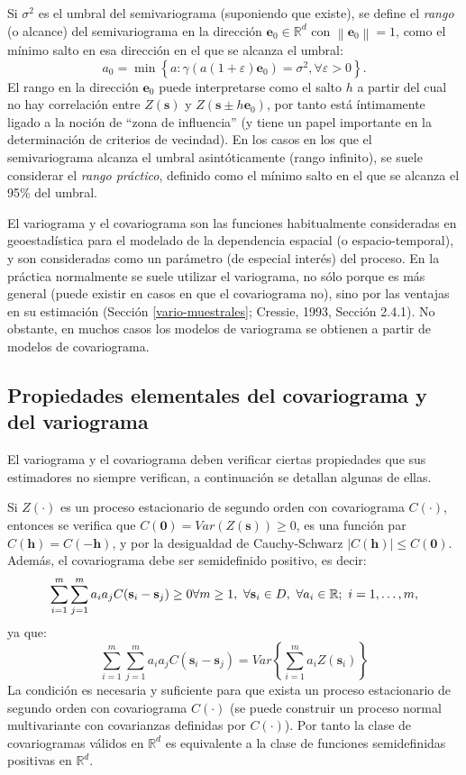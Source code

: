 \documentclass[
  spanish,
]{book}
\theoremstyle{break}
\begin{document}
Si \(\sigma ^{2}\) es el umbral del semivariograma (suponiendo que existe), se define el \emph{rango} (o alcance) del semivariograma en la dirección \(\mathbf{e}_0 \in \mathbb{R}^{d}\) con \(\left\| \mathbf{e}_0 \right\| = 1\), como el mínimo salto en esa dirección en el que se alcanza el umbral:
\[a_0 =\min \left\{ a:\gamma (a\left( 1+\varepsilon \right) \mathbf{e}_0 )=\sigma ^{2} , \forall \varepsilon >0\right\}.\]
El rango en la dirección \(\mathbf{e}_0\) puede interpretarse como el salto \(h\) a partir del cual no hay correlación entre \(Z(\mathbf{s})\) y \(Z(\mathbf{s}\pm h\mathbf{e}_0)\), por tanto está íntimamente ligado a la noción de ``zona de influencia'' (y tiene un papel importante en la determinación de criterios de vecindad).
En los casos en los que el semivariograma alcanza el umbral asintóticamente (rango infinito), se suele considerar el \emph{rango práctico}, definido como el mínimo salto en el que se alcanza el 95\% del umbral.

El variograma y el covariograma son las funciones habitualmente consideradas en geoestadística para el modelado de la dependencia espacial (o espacio-temporal), y son consideradas como un parámetro (de especial interés) del proceso.
En la práctica normalmente se suele utilizar el variograma, no sólo porque es más general (puede existir en casos en que el covariograma no), sino por las ventajas en su estimación (Sección \ref{vario-muestrales}; Cressie, 1993, Sección 2.4.1).
No obstante, en muchos casos los modelos de variograma se obtienen a partir de modelos de covariograma.

\hypertarget{propiedades-elementales}{%
\subsection{Propiedades elementales del covariograma y del variograma}\label{propiedades-elementales}}

El variograma y el covariograma deben verificar ciertas propiedades que sus estimadores no siempre verifican, a continuación se detallan algunas de ellas.

Si \(Z(\cdot)\) es un proceso estacionario de segundo orden con covariograma \(C(\cdot)\),
entonces se verifica que \(C(\mathbf{0}) = Var( Z(\mathbf{s}) ) \geq 0\), es una función par \(C(\mathbf{h})=C(-\mathbf{h})\), y por la desigualdad de Cauchy-Schwarz \(\left| C(\mathbf{h})\right| \leq C(\mathbf{0})\).
Además, el covariograma debe ser semidefinido positivo, es decir:
\[\sum\limits_{i=1}^{m} \sum\limits_{j=1}^{m} a_i a_j C(\mathbf{s}_i-\mathbf{s}_j) \geq 0  \\
\forall m\geq 1,\ \forall \mathbf{s}_i \in D,\ \forall a_i \in \mathbb{R};\ i=1, \ldots,m,\]
ya que:
\[\sum\limits_{i=1}^{m}\sum\limits_{j=1}^{m}a_i a_j C(\mathbf{s}_i -\mathbf{s}_j) = Var\left\{\sum\limits_{i=1}^{m}a_i Z(\mathbf{s}_i) \right\}\]
La condición es necesaria y suficiente para que exista un proceso estacionario de segundo orden con covariograma \(C(\cdot)\) (se puede construir un proceso normal multivariante con covarianzas definidas por \(C(\cdot)\)).
Por tanto la clase de covariogramas válidos en \(\mathbb{R}^d\) es equivalente a la clase de funciones semidefinidas positivas en \(\mathbb{R}^d\).
\end{document}
